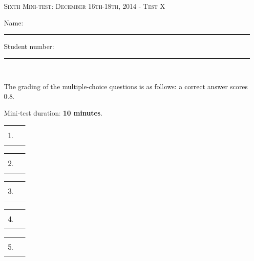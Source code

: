 \documentclass{docist}
\begin{document}
\thispagestyle{empty}

\begin{center}
  {\Large \textsc{Sixth Mini-test: December 16th-18th, 2014 - Test X\\[2ex]}}
  {\normalsize    Name: \rule{8cm}{1pt} Student number: \rule{2cm}{1pt}\\[2ex]}
\end{center}

The grading of the multiple-choice questions is as follows: a correct answer scores 0.8.


Mini-test duration: \textbf{10 minutes}. 

\begin{center}
%
  \begin{tabular}{rc}
    1. & \rule{1cm}{1pt} \\[2ex]
  \end{tabular}
  \hspace*{0.7cm}
  \begin{tabular}{rc}
    2. & \rule{1cm}{1pt} \\[2ex]
  \end{tabular}
  \hspace*{0.7cm}
  \begin{tabular}{rc}
    3. & \rule{1cm}{1pt} \\[2ex]
  \end{tabular}
  \hspace*{0.7cm}
  \begin{tabular}{rc}
    4. & \rule{1cm}{1pt} \\[2ex]
  \end{tabular}
  \hspace*{0.7cm}
  \begin{tabular}{rc}
    5. & \rule{1cm}{1pt} \\[2ex]
  \end{tabular}
\end{center}





\qSilkMobileDevices

\qSilkPredictor

\qSilkCaching

\qSilkConnections


\end{document}
